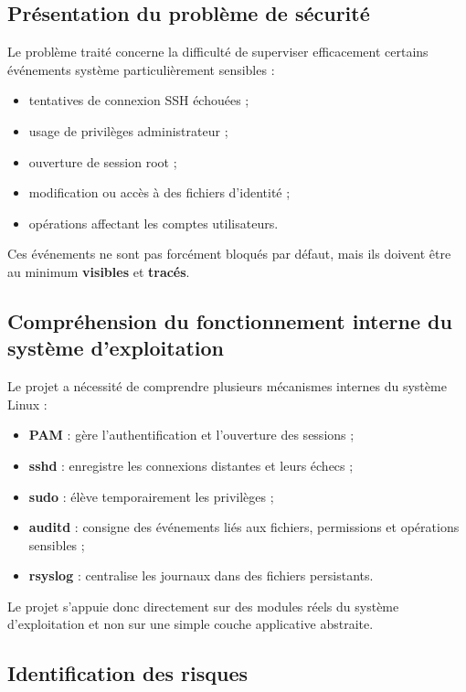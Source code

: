 \documentclass[12pt,a4paper]{article}
\begin{document}
\subsection{Présentation du problème de sécurité}

Le problème traité concerne la difficulté de superviser efficacement certains événements système particulièrement sensibles :
\begin{itemize}
    \item tentatives de connexion SSH échouées ;
    \item usage de privilèges administrateur ;
    \item ouverture de session root ;
    \item modification ou accès à des fichiers d’identité ;
    \item opérations affectant les comptes utilisateurs.
\end{itemize}

Ces événements ne sont pas forcément bloqués par défaut, mais ils doivent être au minimum \textbf{visibles} et \textbf{tracés}.

\subsection{Compréhension du fonctionnement interne du système d’exploitation}

Le projet a nécessité de comprendre plusieurs mécanismes internes du système Linux :

\begin{itemize}
    \item \textbf{PAM} : gère l’authentification et l’ouverture des sessions ;
    \item \textbf{sshd} : enregistre les connexions distantes et leurs échecs ;
    \item \textbf{sudo} : élève temporairement les privilèges ;
    \item \textbf{auditd} : consigne des événements liés aux fichiers, permissions et opérations sensibles ;
    \item \textbf{rsyslog} : centralise les journaux dans des fichiers persistants.
\end{itemize}

Le projet s’appuie donc directement sur des modules réels du système d’exploitation et non sur une simple couche applicative abstraite.

\subsection{Identification des risques}
\end{document}
